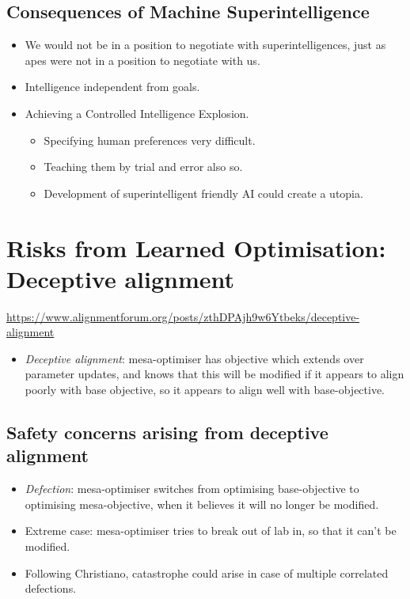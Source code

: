 \subsection{Consequences of Machine Superintelligence}

\begin{itemize}
    \item We would not be in a position to negotiate with superintelligences, just as apes were not in a position to negotiate with us.
    \item Intelligence independent from goals.
    \item Achieving a Controlled Intelligence Explosion.
    \begin{itemize}
        \item Specifying human preferences very difficult.
        \item Teaching them by trial and error also so.
        \item Development of superintelligent friendly AI could create a utopia.
    \end{itemize}
\end{itemize}


\section{Risks from Learned Optimisation: Deceptive alignment}

\url{https://www.alignmentforum.org/posts/zthDPAjh9w6Ytbeks/deceptive-alignment}

\begin{itemize}
    \item \emph{Deceptive alignment}: mesa-optimiser has objective which extends over parameter updates, and knows that this will be modified if it appears to align poorly with base objective, so it appears to align well with base-objective.
\end{itemize}


\subsection{Safety concerns arising from deceptive alignment}

\begin{itemize}
    \item \emph{Defection}: mesa-optimiser switches from optimising base-objective to optimising mesa-objective, when it believes it will no longer be modified.
    \item Extreme case: mesa-optimiser tries to break out of lab in, so that it can't be modified.
    \item Following Christiano, catastrophe could arise in case of multiple correlated defections.
\end{itemize}


